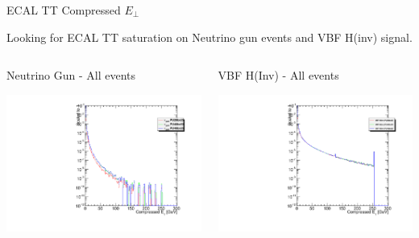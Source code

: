 \documentclass[8pt]{beamer}
\begin{document}
\begin{frame}{ECAL TT Compressed $E_{\perp}$}

Looking for ECAL TT saturation on Neutrino gun events and VBF H(inv) signal.

\begin{columns}
 
\begin{block}{Neutrino Gun - All events}
\centering

\includegraphics[width=\linewidth]{fig/EcalTT_Val_NG.pdf}

\end{block}

\begin{block}{VBF H(Inv) - All events}
\centering

\includegraphics[width=\linewidth]{fig/EcalTT_Val_Sig.pdf}


\end{block}
\end{columns}
\end{frame}
\end{document}

